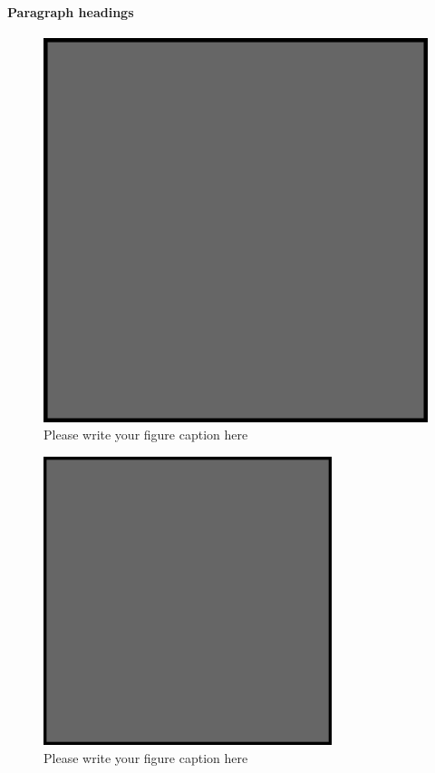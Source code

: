     \paragraph{Paragraph headings}
    \begin{figure}
        \includegraphics{example.eps}
        \caption{Please write your figure caption here}
        \label{fig:1}
    \end{figure}
    \begin{figure}
        \includegraphics[width=0.75\textwidth]{example.eps}
        \caption{Please write your figure caption here}
        \label{fig:2}
    \end{figure}


